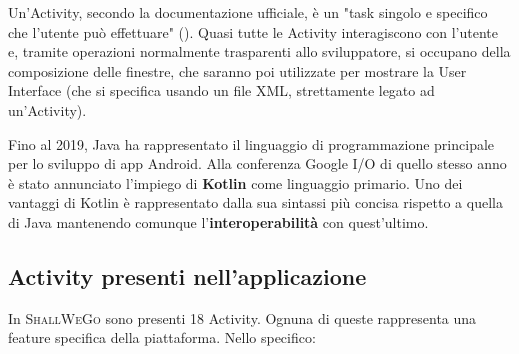             Un'Activity, secondo la documentazione ufficiale, è un "task singolo e specifico che l'utente può effettuare" (\cite{AndroidDoc}). Quasi tutte le Activity interagiscono con l'utente e, tramite operazioni normalmente trasparenti allo sviluppatore, si occupano della composizione delle finestre, che saranno poi utilizzate per mostrare la User Interface (che si specifica usando un file XML, strettamente legato ad un'Activity).

            Fino al 2019, Java ha rappresentato il linguaggio di programmazione principale per lo sviluppo di app Android. Alla conferenza Google I/O di quello stesso anno è stato annunciato l'impiego di \textbf{Kotlin} come linguaggio primario. Uno dei vantaggi di Kotlin è rappresentato dalla sua sintassi più concisa rispetto a quella di Java mantenendo comunque l'\textbf{interoperabilità} con quest'ultimo.
        \newpage
        \subsection{Activity presenti nell'applicazione}
            In \textsc{ShallWeGo} sono presenti 18 Activity. Ognuna di queste rappresenta una feature specifica della piattaforma. Nello specifico:

